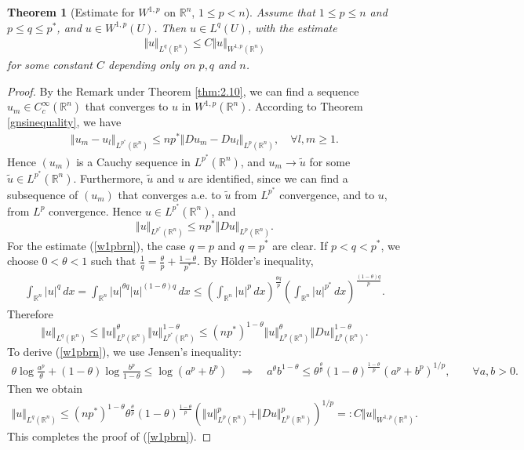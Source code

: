 \documentclass{article}
\numberwithin{equation}{section}
\newcommand{\bbR}{\mathbb{R}}
\theoremstyle{plain}
\newtheorem{theorem}{Theorem}[section]
\theoremstyle{definition}
\begin{document}
\begin{theorem}[Estimate for $W^{1,p}$ on $\bbR^n$, $1\leq p<n$]\label{thm:4.3}
Assume that $1\leq p\leq n$ and $p\leq q\leq p^*$, and $u\in W^{1,p}(U)$. Then $u\in L^q(U)$, with the estimate
	\begin{align}
		\Vert u\Vert_{L^q(\bbR^n)}\leq C\Vert u\Vert_{W^{1,p}(\bbR^n)}\label{w1pbrn}
	\end{align}
	for some constant $C$ depending only on $p,q$ and $n$.
\end{theorem}
\newpage
\begin{proof}
By the Remark under Theorem \ref{thm:2.10}, we can find a sequence $u_m\in C_c^\infty(\bbR^n)$ that converges to $u$ in $W^{1,p}(\bbR^n)$. According to Theorem \ref{gnsinequality}, we have
\begin{align*}
	\Vert u_m-u_l\Vert_{L^{p^*}(\bbR^n)}\leq np^*\Vert Du_m-Du_l\Vert_{L^p(\bbR^n)},\quad\forall l,m\geq 1.
\end{align*}
Hence $(u_m)$ is a Cauchy sequence in $L^{p^*}(\bbR^n)$, and $u_m\to\tilde u$ for some $\tilde u\in L^{p^*}(\bbR^n)$. Furthermore, $\tilde u$ and $u$ are identified, since we can find a subsequence of $(u_m)$ that converges a.e. to $\tilde u$ from $L^{p^*}$ convergence, and to $u$, from $L^p$ convergence. Hence $u\in L^{p^*}(\bbR^n)$, and $$\Vert u\Vert_{L^{p^*}(\bbR^n)}\leq np^*\Vert Du\Vert_{L^p(\bbR^n)}.$$
For the estimate (\ref{w1pbrn}), the case $q=p$ and $q=p^*$ are clear. If $p<q<p^*$, we choose $0<\theta< 1$ such that $\frac{1}{q}=\frac{\theta}{p}+\frac{1-\theta}{p^*}$. By Hölder's inequality,
\begin{align*}
\int_{\bbR^n}\vert u\vert^q\,dx=\int_{\bbR^n}\vert u\vert^{\theta q}\vert u\vert^{(1-\theta)q}\,dx\leq\left(\int_{\bbR^n}\vert u\vert^p\,dx\right)^{\frac{\theta q}{p}}\left(\int_{\bbR^n}\vert u\vert^{p^*}\,dx\right)^{\frac{(1-\theta)q}{p}}.
\end{align*}
Therefore $$\Vert u\Vert_{L^q(\bbR^n)}\leq \Vert u\Vert_{L^p(\bbR^n)}^{\theta}\Vert u\Vert_{L^{p^*}(\bbR^n)}^{1-\theta}\leq (np^*)^{1-\theta}\Vert u\Vert_{L^p(\bbR^n)}^\theta\Vert Du\Vert_{L^p(\bbR^n)}^{1-\theta}.$$ 
To derive (\ref{w1pbrn}), we use Jensen's inequality:
\begin{align*}
\theta\log\frac{a^p}{\theta}+(1-\theta)\log\frac{b^p}{1-\theta}\leq\log(a^p+b^p)\quad\Rightarrow\quad a^\theta b^{1-\theta}\leq\theta^{\frac{\theta}{p}}(1-\theta)^{\frac{1-\theta}{p}}(a^p+b^p)^{1/p},\qquad \forall a,b>0.
\end{align*}
Then we obtain
\begin{align*}
	\Vert u\Vert_{L^q(\bbR^n)}\leq(np^*)^{1-\theta}\theta^{\frac{\theta}{p}}(1-\theta)^{\frac{1-\theta}{p}}\left(\Vert u\Vert_{L^p(\bbR^n)}^p+\Vert Du\Vert_{L^p(\bbR^n)}^p\right)^{1/p}=:C\Vert u\Vert_{W^{1,p}(\bbR^n)}.
\end{align*}
This completes the proof of (\ref{w1pbrn}).
\end{proof}
\end{document}

